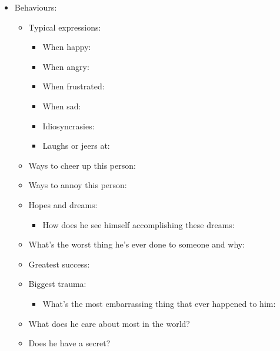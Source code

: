 \documentclass[openleft,oneside,showtrims]{memoir}
\begin{document}
\begin{itemize}
\begin{itemize}
\item Behaviours:
\label{sec:orge00abbd}

\begin{itemize}
\item Typical expressions:
\label{sec:org3d0b92b}

\begin{itemize}
\item When happy:

\item When angry:

\item When frustrated:

\item When sad:

\item Idiosyncrasies:

\item Laughs or jeers at:
\end{itemize}

\item Ways to cheer up this person:
\label{sec:org4f84665}

\item Ways to annoy this person:
\label{sec:org4b1c250}

\item Hopes and dreams:
\label{sec:org9c3bd7d}

\begin{itemize}
\item How does he see himself accomplishing these dreams:
\end{itemize}

\item What’s the worst thing he’s ever done to someone and why:
\label{sec:org3102945}

\item Greatest success:
\label{sec:org2cd55cc}

\item Biggest trauma:
\label{sec:orga7d0b54}

\begin{itemize}
\item What's the most embarrassing thing that ever happened to him:
\end{itemize}

\item What does he care about most in the world?
\label{sec:org5454a02}

\item Does he have a secret?
\label{sec:org483dee9}


\end{itemize}
\end{itemize}
\end{itemize}
\end{document}
